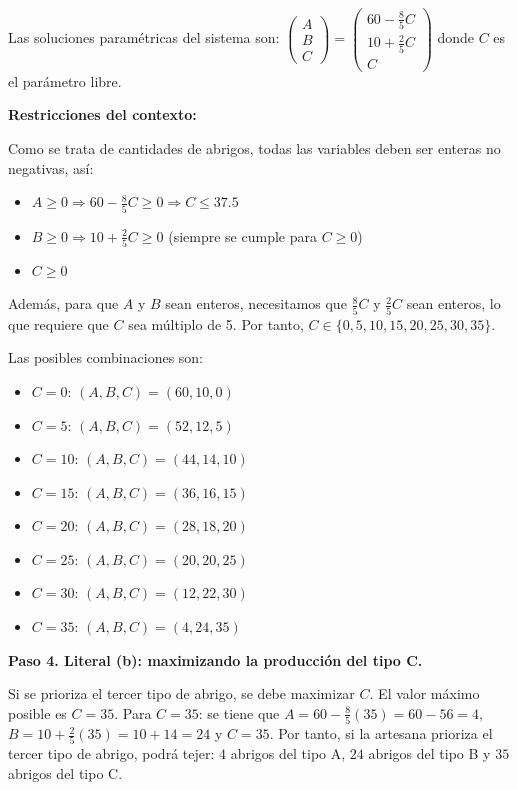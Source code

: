 \begin{prob}
\begin{myproof}
Las soluciones paramétricas del sistema son: $\boxed{\begin{pmatrix} A \\ B \\ C \end{pmatrix} = \begin{pmatrix} 60-\frac{8}{5}C\\ 10+\frac{2}{5}C\\C \end{pmatrix}}$ donde $C$ es el parámetro libre.

\textbf{Restricciones del contexto:}

Como se trata de cantidades de abrigos, todas las variables deben ser enteras no negativas, así:
\begin{itemize}
\item $A \geq 0 \Rightarrow 60 - \frac{8}{5}C \geq 0 \Rightarrow C \leq 37.5$
\item $B \geq 0 \Rightarrow 10 + \frac{2}{5}C \geq 0$ (siempre se cumple para $C \geq 0$)
\item $C \geq 0$
\end{itemize}

Además, para que $A$ y $B$ sean enteros, necesitamos que $\frac{8}{5}C$ y $\frac{2}{5}C$ sean enteros, lo que requiere que $C$ sea múltiplo de 5. Por tanto, $C \in \{0, 5, 10, 15, 20, 25, 30, 35\}$.

Las posibles combinaciones son:
\begin{itemize}
\item $C = 0$: $(A, B, C) = (60, 10, 0)$
\item $C = 5$: $(A, B, C) = (52, 12, 5)$
\item $C = 10$: $(A, B, C) = (44, 14, 10)$
\item $C = 15$: $(A, B, C) = (36, 16, 15)$
\item $C = 20$: $(A, B, C) = (28, 18, 20)$
\item $C = 25$: $(A, B, C) = (20, 20, 25)$
\item $C = 30$: $(A, B, C) = (12, 22, 30)$
\item $C = 35$: $(A, B, C) = (4, 24, 35)$
\end{itemize}

\textbf{Paso 4. Literal (b): maximizando la producción del tipo C.}

Si se prioriza el tercer tipo de abrigo, se debe maximizar $C$. El valor máximo posible es $C = 35$. Para $C = 35$: se tiene que $A = 60 - \frac{8}{5}(35) = 60 - 56 = 4,$ $B = 10 + \frac{2}{5}(35) = 10 + 14 = 24$ y $C = 35.$ Por tanto, si la artesana prioriza el tercer tipo de abrigo, podrá tejer: $\boxed{4}$ abrigos del tipo A, $\boxed{24}$ abrigos del tipo B y $\boxed{35}$ abrigos del tipo C.
\end{myproof}
\end{prob}

